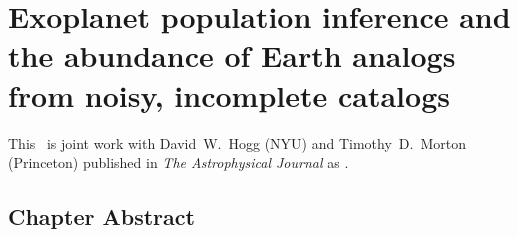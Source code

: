 \renewcommand{\chapid}{exopop}

\newcommand{\True}{\foreign{True}}
\newcommand{\Truth}{\foreign{Truth}}

\newcommand{\densityunit}{{\ensuremath{\mathrm{nat}^{-2}}}}
\newcommand{\rate}{\ensuremath{\Gamma}}
\newcommand{\ratepar}{{\ensuremath{\theta}}}
\newcommand{\ratepars}{{\ensuremath{\bvec{\ratepar}}}}
\newcommand{\obs}[1]{\ensuremath{\hat{#1}}}
\newcommand{\radius}{\ensuremath{R}}
\newcommand{\period}{\ensuremath{P}}
\newcommand{\completeness}{{\ensuremath{Q_\mathrm{c}}}}
\newcommand{\transitprob}{{\ensuremath{Q_\mathrm{t}}}}
\renewcommand{\data}{{\ensuremath{\bvec{x}}}}
\newcommand{\entry}{{\ensuremath{\bvec{w}}}}
\newcommand{\catalog}{{\ensuremath{\bvec{\entry}}}}
\newcommand{\interim}{{\ensuremath{\bvec{\alpha}}}}
\newcommand{\binarea}{{\ensuremath{\Delta}}}
\newcommand{\bincenter}{{\ensuremath{\bvec{x}}}}
\newcommand{\binheight}{{\ensuremath{w}}}
\newcommand{\binheights}{{\ensuremath{\bvec{\binheight}}}}
\newcommand{\mean}{{\ensuremath{\mu}}}
\newcommand{\smooth}{{\ensuremath{\lambda}}}
\newcommand{\smoothpars}{{\ensuremath{\bvec{\smooth}}}}
\newcommand{\cov}{{\ensuremath{\mathrm{K}}}}
\newcommand{\modela}{\emph{Catalog A}}
\newcommand{\modelb}{\emph{Catalog B}}
\newcommand{\gammaearth}{{\ensuremath{\rate_\oplus}}}
\newcommand{\resultsurl}{\url{http://dx.doi.org/10.5281/zenodo.11507}}


\makeatletter
\renewcommand{\@makefnmark}{\hbox{\textsuperscript{\footnotesize{\@thefnmark}}}}
\makeatother

\chapter{Exoplanet population inference and the abundance
         of Earth analogs from noisy, incomplete catalogs}

This \paper\ is joint work with David~W.~Hogg (NYU) and Timothy~D.~Morton
(Princeton) published in \emph{The Astrophysical Journal} as
\citet{Foreman-Mackey:2014}.

\section{Chapter Abstract}

